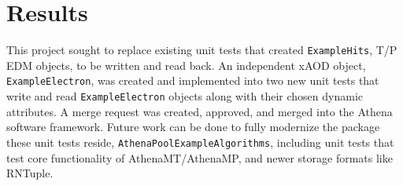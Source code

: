 \section{Results}
This project sought to replace existing unit tests that created \verb|ExampleHits|, T/P EDM objects, to be written and read back. 
An independent xAOD object, \verb|ExampleElectron|, was created and implemented into two new unit tests that write and read \verb|ExampleElectron| objects along with their chosen dynamic attributes. 
A merge request was created, approved, and merged into the Athena software framework.
Future work can be done to fully modernize the package these unit tests reside, \verb|AthenaPoolExampleAlgorithms|, including unit tests that test core functionality of AthenaMT/AthenaMP, and newer storage formats like RNTuple. 
